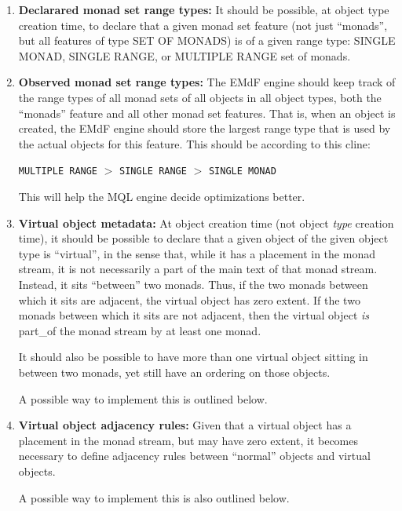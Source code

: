 \documentclass[a4paper,12pt]{article}
\begin{document}
\begin{enumerate}
\item \textbf{Declarared monad set range types:} It should be
  possible, at object type creation time, to declare that a given
  monad set feature (not just ``monads'', but all features of type SET
  OF MONADS) is of a given range type: SINGLE MONAD, SINGLE RANGE, or
  MULTIPLE RANGE set of monads.
  
\item \textbf{Observed monad set range types:} The EMdF engine should
  keep track of the range types of all monad sets of all objects in
  all object types, both the ``monads'' feature and all other monad
  set features.  That is, when an object is created, the EMdF engine
  should store the largest range type that is used by the actual
  objects for this feature.  This should be according to this cline:

  \begin{center}
    \texttt{MULTIPLE RANGE} $>$ \texttt{SINGLE RANGE} $>$ \texttt{SINGLE MONAD}
  \end{center}
  
  \noindent This will help the MQL engine decide optimizations better.
  
\item \textbf{Virtual object metadata:} At object creation time (not
  object \textit{type} creation time), it should be possible to
  declare that a given object of the given object type is ``virtual'',
  in the sense that, while it has a placement in the monad stream, it
  is not necessarily a part of the main text of that monad stream.
  Instead, it sits ``between'' two monads.  Thus, if the two monads
  between which it sits are adjacent, the virtual object has zero
  extent.  If the two monads between which it sits are not adjacent,
  then the virtual object \textit{is} part\_of the monad stream by at
  least one monad.

  It should also be possible to have more than one virtual object
  sitting in between two monads, yet still have an ordering on those
  objects.
 
  A possible way to implement this is outlined below.
 
\item \textbf{Virtual object adjacency rules:} Given that a virtual
  object has a placement in the monad stream, but may have zero
  extent, it becomes necessary to define adjacency rules between
  ``normal'' objects and virtual objects.

  A possible way to implement this is also outlined below.


\end{enumerate}
\end{document}
